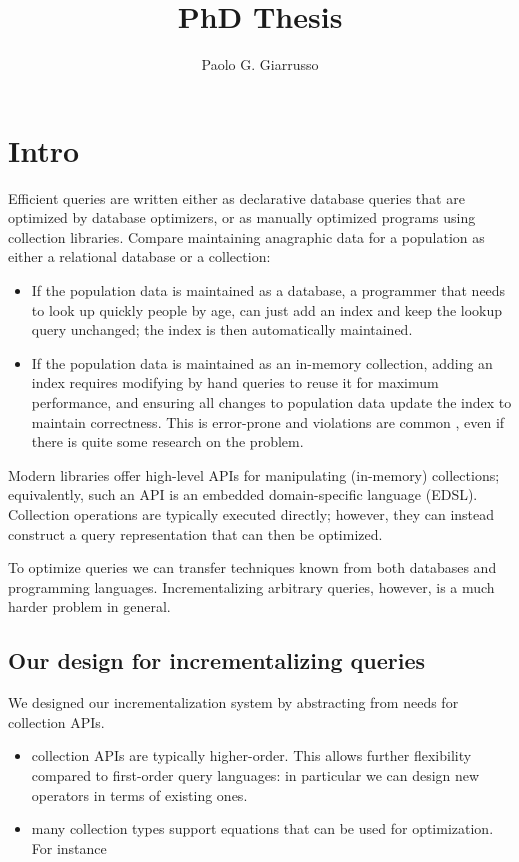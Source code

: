 \documentclass{book}
\title{PhD Thesis}
\author{Paolo G. Giarrusso}
\begin{document}
\maketitle
\chapter{Intro}

Efficient queries are written either as declarative database queries that are
optimized by database optimizers, or as manually optimized programs using
collection libraries. Compare maintaining anagraphic data for a population
as either a relational database or a collection:
\begin{itemize}
\item If the population data is maintained as a database, a programmer that needs to
  look up quickly people by age, can just add an index and keep the lookup query
  unchanged; the index is then automatically maintained.
\item If the population data is maintained as an in-memory collection, adding an
  index requires modifying by hand queries to reuse it for maximum performance,
  and ensuring all changes to population data update the index to maintain
  correctness. This is error-prone and violations are common , even if
  there is quite some research on the problem.
\end{itemize}
Modern libraries offer high-level APIs for manipulating (in-memory) collections;
equivalently, such an API is an embedded domain-specific language (EDSL).
Collection operations are typically executed directly; however, they can instead
construct a query representation that can then be optimized.

To optimize queries we can transfer techniques known from both databases and
programming languages. Incrementalizing arbitrary queries, however, is a much
harder problem in general.

\section{Our design for incrementalizing queries}
We designed our incrementalization system by abstracting from needs for
collection APIs.
\begin{itemize}
\item collection APIs are typically higher-order. This allows further
  flexibility compared to first-order query languages: in particular we can
  design new operators in terms of existing ones.
\item many collection types support equations that can be used for optimization.
  For instance
\end{itemize}
\end{document}
